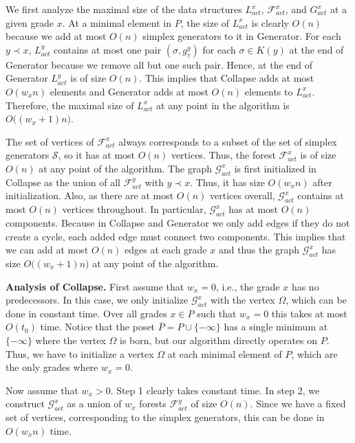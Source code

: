 \documentclass[english,a4paper,nolineno,cleveref]{socg-lipics-v2021}
\newcommand{\Scal}{\mathcal S}
\begin{document}
We first analyze the maximal size of the data structures $L_{act}^x$, $\mathcal{F}_{act}^x$, and $G_{act}^x$ at a given grade $x$. At a minimal element in $P$, the size of $L_{act}^x$ is clearly $O(n)$ because we add at most $O(n)$ simplex generators to it in {\sc Generator}. For each $y\prec x$, $L_{act}^y$ contains at most one pair $(\sigma,g_\tau^y)$ for each $\sigma \in K(y)$ at the end of {\sc Generator} because we remove all but one such pair. Hence, at the end of {\sc Generator} $L_{act}^y$ is of size $O(n)$. This implies that {\sc Collapse} adds at most $O(w_xn)$ elements and {\sc Generator} adds at most $O(n)$ elements to $L_{act}^x$. Therefore, the maximal size of $L_{act}^x$ at any point in the algorithm is $O\big((w_x+1)n\big)$. 


The set of vertices of $\mathcal{F}_{act}^x$ always corresponds to a subset of the set of simplex generators $\Scal$, so it has at most $O(n)$ vertices. Thus, the forest $\mathcal{F}_{act}^x$ is of size $O(n)$ at any point of the algorithm. The graph $\mathcal{G}_{act}^x$ is first initialized in {\sc Collapse} as the union of all $\mathcal{F}_{act}^y$ with $y\prec x$. Thus, it has size $O(w_x n)$ after initialization. Also, as there are at most $O(n)$ vertices overall, $\mathcal{G}_{act}^x$ contains at most $O(n)$ vertices throughout. In particular, $\mathcal{G}_{act}^x$ has at most $O(n)$ components. Because in {\sc Collapse} and {\sc Generator} we only add edges if they do not create a cycle, each added edge must connect two components. This implies that we can add at most $O(n)$ edges at each grade $x$ and thus the graph $\mathcal{G}_{act}^x$ has size $O\big((w_x+1)n\big)$ at any point of the algorithm.


\vspace{2pt}
{\bf Analysis of {\sc Collapse}.}
First assume that $w_x=0$, i.e., the grade $x$ has no predecessors. In this case, we only initialize $\mathcal{G}_{act}^x$ with the vertex $\Omega$, which can be done in constant time. Over all grades $x\in P$ such that $w_x=0$ this takes at most $O(t_0)$ time. Notice that the poset $\overline{P}=P\cup\{-\infty\}$ has a single minimum at $\{-\infty\}$ where the vertex $\Omega$ is born, but our algorithm directly operates on $P$. Thus, we have to initialize a vertex $\Omega$ at each minimal element of $P$, which are the only grades where $w_x=0$.

Now assume that $w_x>0$. Step 1 clearly takes constant time. In step 2, we construct $\mathcal{G}_{act}^x$ as a union of $w_x$ forests $\mathcal{F}_{act}^y$ of size $O(n)$. Since we have a fixed set of vertices, corresponding to the simplex generators, this can be done in $O(w_xn)$ time. 
\end{document}
